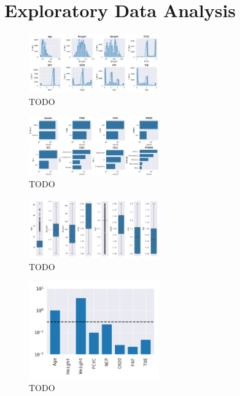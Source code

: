 \chapter{Exploratory Data Analysis}\label{ch:exploratory-data-analysis}



\begin{figure}[h]
    \centering
    \includegraphics[width=0.5\textwidth]{figures/plot_Feature Distribution (Numerical)}
    \caption{TODO}
    \label{fig:feature_distribution_numerical)}
\end{figure}


\begin{figure}[h]
    \centering
    \includegraphics[width=0.5\textwidth]{figures/plot_Feature Distribution (Discrete)}
    \caption{TODO}
    \label{fig:feature_distribution_discrete)}
\end{figure}


\begin{figure}[h]
    \centering
    \includegraphics[width=0.5\textwidth]{figures/plot_Feature Spread (Numerical)}
    \caption{TODO}
    \label{fig:feature_spread_numerical)}
\end{figure}


\begin{figure}[h]
    \centering
    \includegraphics[width=0.5\textwidth]{figures/plot_Outlier Sensitivity (Numerical)}
    \caption{TODO}
    \label{fig:outlier_sensitivity_numerical)}
\end{figure}

